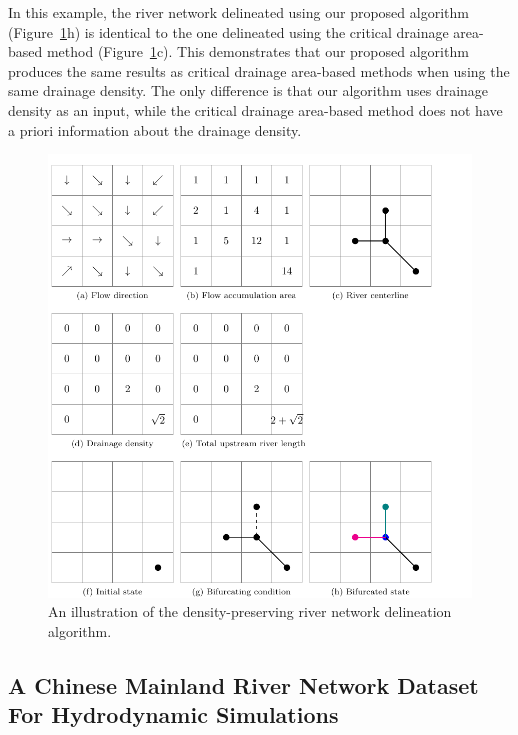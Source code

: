 \documentclass[water,article,submit,pdftex,moreauthors]{Definitions/mdpi}
\begin{document}
In this example, the river network delineated using our proposed algorithm (Figure~\ref{fig:example}h) is identical to the one delineated using the critical drainage area-based method (Figure~\ref{fig:example}c). This demonstrates that our proposed algorithm produces the same results as critical drainage area-based methods when using the same drainage density. The only difference is that our algorithm uses drainage density as an input, while the critical drainage area-based method does not have a priori information about the drainage density.

\begin{figure}[H]
  \includegraphics[width=\textwidth]{example.pdf}
  \caption{An illustration of the density-preserving river network delineation algorithm.\label{fig:example}}
\end{figure}

\subsection{A Chinese Mainland River Network Dataset For Hydrodynamic Simulations}
\end{document}
